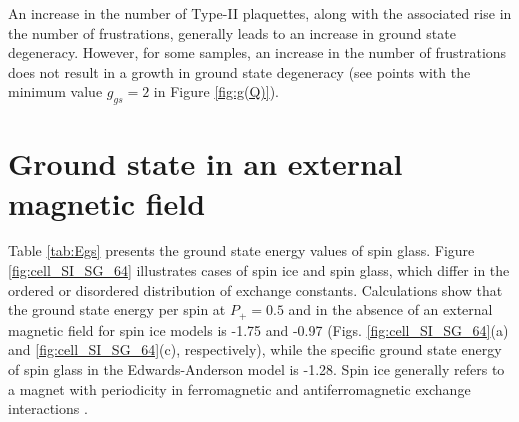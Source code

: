 \documentclass[utf8, babel, sor, jor, amsmath, amssymb, reprint]{elsarticle} %
\begin{document}
An increase in the number of Type-II plaquettes, along with the associated rise in the number of frustrations, generally leads to an increase in ground state degeneracy. However, for some samples, an increase in the number of frustrations does not result in a growth in ground state degeneracy (see points with the minimum value $g_{gs}=2$ in Figure \ref{fig:g(Q)}). 

\section{Ground state in an external magnetic field}

Table \ref{tab:Egs} presents the ground state energy values of spin glass. Figure \ref{fig:cell_SI_SG_64} illustrates cases of spin ice and spin glass, which differ in the ordered or disordered distribution of exchange constants. Calculations show that the ground state energy per spin at $P_+ = 0.5$ and in the absence of an external magnetic field for spin ice models is -1.75 and -0.97 (Figs. \ref{fig:cell_SI_SG_64}(a) and \ref{fig:cell_SI_SG_64}(c), respectively), while the specific ground state energy of spin glass in the Edwards-Anderson model is -1.28. Spin ice generally refers to a magnet with periodicity in ferromagnetic and antiferromagnetic exchange interactions \cite{peretyatko2017interplay, otsuka2018husimi, andriushchenko2019large, shevchenko2017effect, kato2022flux}. 
\end{document}
